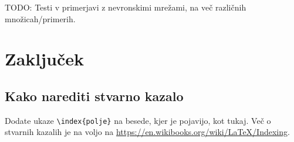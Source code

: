 \documentclass[12pt,a4paper,twoside]{article}
\theoremstyle{definition} %
\theoremstyle{plain} %
\numberwithin{equation}{section}  %
\begin{document}

TODO: Testi v primerjavi z nevronskimi mrežami, na več različnih množicah/primerih.



\section{Zaključek}  





\subsection{Kako narediti stvarno kazalo}
Dodate ukaze \verb|\index{polje}| na besede, kjer je pojavijo, kot tukaj.
Več o stvarnih kazalih je na voljo na \url{https://en.wikibooks.org/wiki/LaTeX/Indexing}.

\end{document}
